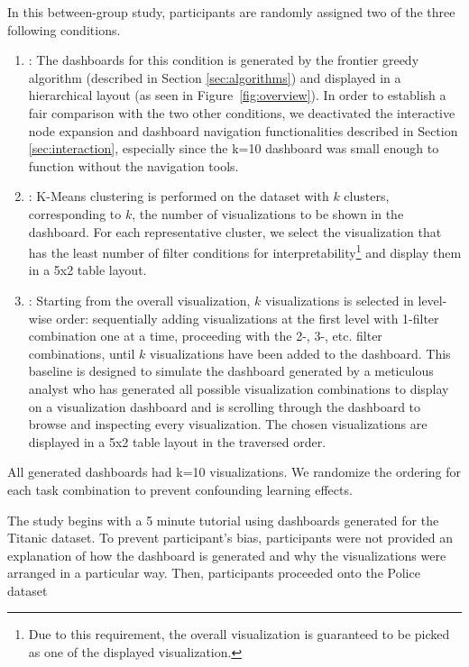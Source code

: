 \par In this between-group study, participants are randomly assigned two of the three following conditions.
\begin{enumerate}
	\item \system: The dashboards for this condition is generated by the frontier greedy algorithm (described in Section \ref{sec:algorithms}) and displayed in a hierarchical layout (as seen in Figure~\ref{fig:overview}). In order to establish a fair comparison with the two other conditions, we deactivated the interactive node expansion and dashboard navigation functionalities described in Section \ref{sec:interaction}, especially since the k=10 dashboard was small enough to function without the navigation tools.

	\item \cluster: K-Means clustering is performed on the dataset with $k$ clusters, corresponding to $k$, the number of visualizations to be shown in the dashboard. For each representative cluster, we select the visualization that has the least number of filter conditions for interpretability\footnote{Due to this requirement, the overall visualization is guaranteed to be picked as one of the displayed visualization.} and display them in a 5x2 table layout.

	\item \BFS: Starting from the overall visualization, $k$ visualizations is selected in level-wise order: sequentially adding visualizations at the first level with 1-filter combination one at a time, proceeding with the 2-, 3-, etc. filter combinations, until $k$ visualizations have been added to the dashboard. This baseline is designed to simulate the dashboard generated by a meticulous analyst who has generated all possible visualization combinations to display on a visualization dashboard and is scrolling through the dashboard to browse and inspecting every visualization. The chosen visualizations are displayed in a 5x2 table layout in the traversed order.
\end{enumerate}
All generated dashboards had k=10 visualizations. We randomize the ordering for each task combination to prevent confounding learning effects.
\par The study begins with a 5 minute tutorial using dashboards generated for the Titanic dataset. To prevent participant's bias, participants were not provided an explanation of how the dashboard is generated and why the visualizations were arranged in a particular way. Then, participants proceeded onto the Police dataset\cite{police} %
